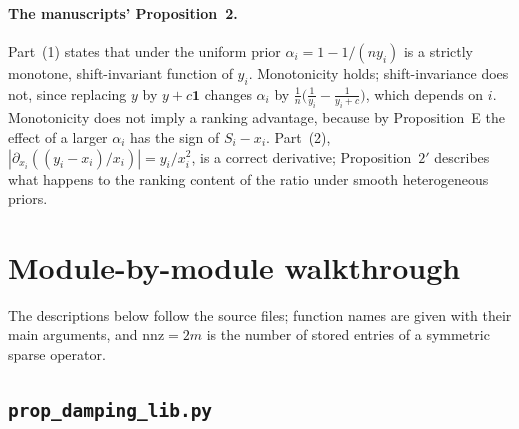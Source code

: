 \documentclass[11pt,a4paper]{article}
\theoremstyle{definition}
\theoremstyle{plain}
\newcommand{\one}{\mathbf{1}}
\begin{document}
\paragraph{The manuscripts' Proposition~2.} Part~(1) states that under the uniform prior $\alpha_i=1-1/(ny_i)$ is a strictly monotone, shift-invariant function of $y_i$. Monotonicity holds; shift-invariance does not, since replacing $y$ by $y+c\one$ changes $\alpha_i$ by $\frac1n\big(\frac1{y_i}-\frac1{y_i+c}\big)$, which depends on $i$. Monotonicity does not imply a ranking advantage, because by Proposition~E the effect of a larger $\alpha_i$ has the sign of $S_i-x_i$. Part~(2), $|\partial_{x_i}((y_i-x_i)/x_i)|=y_i/x_i^2$, is a correct derivative; Proposition~$2'$ describes what happens to the ranking content of the ratio under smooth heterogeneous priors.

\section{Module-by-module walkthrough}\label{sec:modules}

The descriptions below follow the source files; function names are given with their main arguments, and $\mathrm{nnz}=2m$ is the number of stored entries of a symmetric sparse operator.

\subsection{\texorpdfstring{\texttt{prop\_damping\_lib.py}}{prop\_damping\_lib.py}}
\end{document}
